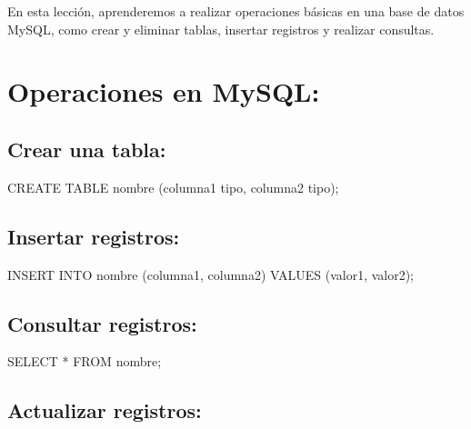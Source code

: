 \documentclass[
  a4paper,
  DIV=11,
  numbers=noendperiod,
  onepage,
  openany]{scrreprt}
\newenvironment{Shaded}{\begin{snugshade}}{\end{snugshade}}
\newcommand{\KeywordTok}[1]{\textcolor[rgb]{0.00,0.23,0.31}{#1}}
\newcommand{\NormalTok}[1]{\textcolor[rgb]{0.00,0.23,0.31}{#1}}
\newcommand{\OperatorTok}[1]{\textcolor[rgb]{0.37,0.37,0.37}{#1}}
\begin{document}
En esta lección, aprenderemos a realizar operaciones básicas en una base
de datos MySQL, como crear y eliminar tablas, insertar registros y
realizar consultas.

\section{Operaciones en MySQL:}\label{operaciones-en-mysql}

\subsection{Crear una tabla:}\label{crear-una-tabla}

\begin{Shaded}
\begin{Highlighting}[]
\KeywordTok{CREATE} \KeywordTok{TABLE}\NormalTok{ nombre (columna1 tipo, columna2 tipo);}
\end{Highlighting}
\end{Shaded}

\subsection{Insertar registros:}\label{insertar-registros}

\begin{Shaded}
\begin{Highlighting}[]
\KeywordTok{INSERT} \KeywordTok{INTO}\NormalTok{ nombre (columna1, columna2) }\KeywordTok{VALUES}\NormalTok{ (valor1, valor2);}
\end{Highlighting}
\end{Shaded}

\subsection{Consultar registros:}\label{consultar-registros}

\begin{Shaded}
\begin{Highlighting}[]
\KeywordTok{SELECT} \OperatorTok{*} \KeywordTok{FROM}\NormalTok{ nombre;}
\end{Highlighting}
\end{Shaded}

\subsection{Actualizar registros:}\label{actualizar-registros}
\end{document}
